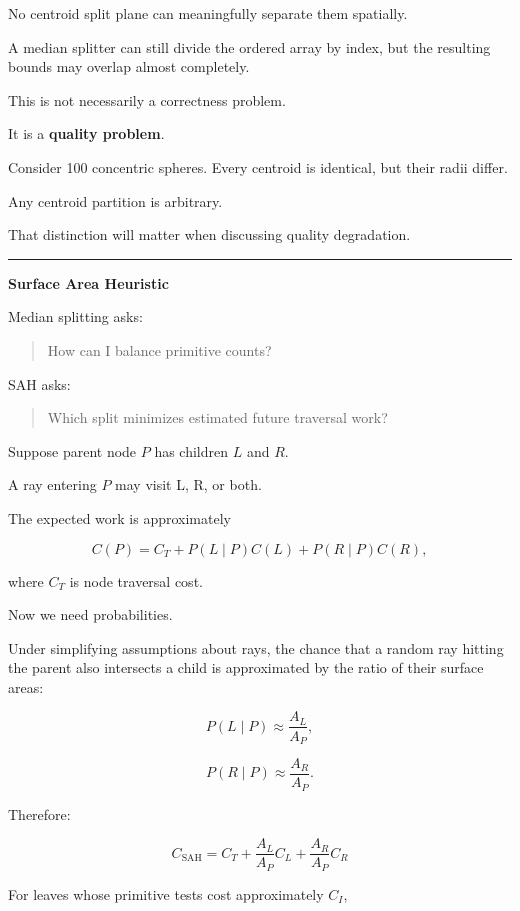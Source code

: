 No centroid split plane can meaningfully separate them spatially.

A median splitter can still divide the ordered array by index, but the resulting bounds may overlap almost completely.

This is not necessarily a correctness problem.

It is a \textbf{quality problem}.

Consider 100 concentric spheres. Every centroid is identical, but their radii differ.

Any centroid partition is arbitrary.

That distinction will matter when discussing quality degradation.

\begin{center}\rule{0.5\linewidth}{0.5pt}\end{center}

\textbf{Surface Area Heuristic}

Median splitting asks:

\begin{quote}
How can I balance primitive counts?
\end{quote}

SAH asks:

\begin{quote}
Which split minimizes estimated future traversal work?
\end{quote}

Suppose parent node \(P\) has children \(L\) and \(R\).

A ray entering \(P\) may visit L, R, or both.

The expected work is approximately

\[
C(P)=
C_T
+
P(L\mid P)C(L)
+
P(R\mid P)C(R),
\]

where \(C_T\) is node traversal cost.

Now we need probabilities.

Under simplifying assumptions about rays, the chance that a random ray hitting the parent also intersects a child is approximated by the ratio of their surface areas:

\[
P(L\mid P)
\approx
\frac{A_L}{A_P},
\]

\[
P(R\mid P)
\approx
\frac{A_R}{A_P}.
\]

Therefore:

\[
\boxed{
C_{\text{SAH}}
=
C_T+
\frac{A_L}{A_P}C_L+
\frac{A_R}{A_P}C_R
}
\]

For leaves whose primitive tests cost approximately \(C_I\),

